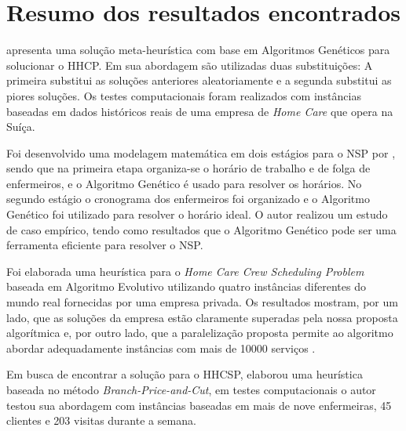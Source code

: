 \section{Resumo dos resultados encontrados}


\cite{nguyen:2016} apresenta uma solução meta-heurística com base em Algoritmos Genéticos para solucionar o \ac{HHCP}. Em sua abordagem são utilizadas duas substituições: A primeira substitui as soluções anteriores aleatoriamente e a segunda substitui as piores soluções. Os testes computacionais foram realizados com instâncias baseadas em dados históricos reais de uma empresa de \textit{Home Care} que opera na Suíça.



Foi desenvolvido uma modelagem matemática em dois estágios para o \ac{NSP} por \cite{tsai:2009}, sendo que na primeira etapa organiza-se o horário de trabalho e de folga de enfermeiros, e o Algoritmo Genético é usado para resolver os horários. No segundo estágio o cronograma dos enfermeiros foi organizado e o Algoritmo Genético foi utilizado para resolver o horário ideal. O autor realizou um estudo de caso empírico, tendo como resultados que o Algoritmo Genético pode ser uma ferramenta eficiente para resolver o \ac{NSP}.

Foi elaborada uma heurística para o \textit{Home Care Crew Scheduling Problem} baseada em Algoritmo Evolutivo utilizando quatro instâncias diferentes do mundo real fornecidas por uma empresa privada. Os resultados mostram, por um lado, que as soluções da empresa estão claramente superadas pela nossa proposta algorítmica e, por outro lado, que a paralelização proposta permite ao algoritmo abordar adequadamente instâncias com mais de 10000 serviços \cite{luna:2013}. 

Em busca de encontrar a solução para o \ac{HHCSP}, \cite{trautsamwieser:2014} elaborou uma heurística baseada no método \textit{Branch-Price-and-Cut}, em testes computacionais o autor testou sua abordagem com instâncias baseadas em mais de nove enfermeiras, 45 clientes e 203 visitas durante a semana.

